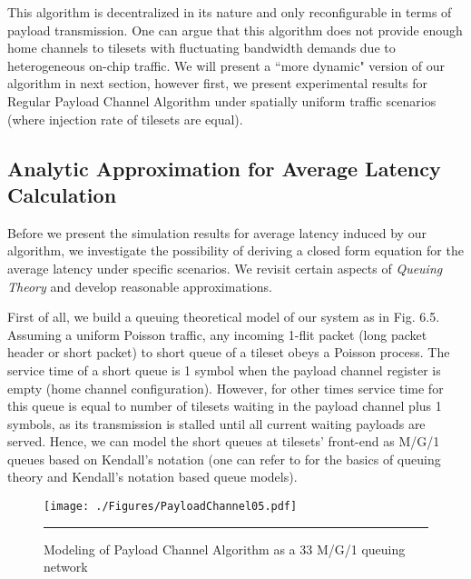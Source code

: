 This algorithm is decentralized in its nature and only reconfigurable in terms of payload transmission. One can argue that this algorithm does not provide enough home channels to tilesets with fluctuating bandwidth demands due to heterogeneous on-chip traffic. We will present a ``more dynamic" version of our algorithm in next section, however first, we present experimental results for Regular Payload Channel Algorithm under spatially uniform traffic scenarios (where injection rate of tilesets are equal).

\subsection{Analytic Approximation for Average Latency Calculation}

Before we present the simulation results for average latency induced by our algorithm, we investigate the possibility of deriving a closed form equation for the average latency under specific scenarios. We revisit certain aspects of \textit{Queuing Theory} and develop reasonable approximations. 

First of all, we build a queuing theoretical model of our system as in Fig. 6.5. Assuming a uniform Poisson traffic, any incoming 1-flit packet (long packet header or short packet) to short queue of a tileset obeys a Poisson process. The service time of a short queue is 1 symbol when the payload channel register is empty (home channel configuration). However, for other times service time for this queue is equal to number of tilesets waiting in the payload channel plus 1 symbols, as its transmission is stalled until all current waiting payloads are served. Hence, we can model the short queues at tilesets' front-end as M/G/1 queues based on Kendall's notation (one can refer to \cite{gross1998fundamentals} for the basics of queuing theory and Kendall's notation based queue models). 

\begin{figure}[htbp]
  \centering
    \texttt{[image: ./Figures/PayloadChannel05.pdf]}
    \rule{35em}{0.5pt}
  \caption[Payload Channel Algorithm Analytic Model]{Modeling of Payload Channel Algorithm as a 33 M/G/1 queuing network}
  \label{fig:Electron}
\end{figure}


